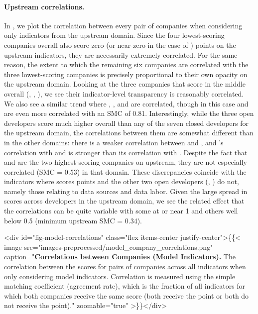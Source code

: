 \documentclass[screen, authorversion, acmsmall]{acmart}
\begin{document}
\paragraph{Upstream correlations.}
In , we plot the correlation between every pair of companies when considering only indicators from the upstream domain.
Since the four lowest-scoring companies overall also score zero (or near-zero in the case of \cohere) points on the upstream indicators, they are necessarily extremely correlated.
For the same reason, the extent to which the remaining six companies are correlated with the three lowest-scoring companies is precisely proportional to their own opacity on the upstream domain.
Looking at the three companies that score in the middle overall (\google, \anthropic, \cohere), we see their indicator-level transparency is reasonably correlated.
We also see a similar trend where \openai, \google, and \anthropic are correlated, though in this case \openai and \cohere are even more correlated with an SMC of 0.81.
Interestingly, while the three open developers score much higher overall than any of the seven closed developers for the upstream domain, the correlations between them are somewhat different than in the other domains: there is a weaker correlation between \huggingface and \stability, and \meta's correlation with \openai and \stability is stronger than its correlation with \huggingface.
Despite the fact that \meta and \huggingface are the two highest-scoring companies on upstream, they are not especially correlated (SMC = 0.53) in that domain.
These discrepancies coincide with the indicators where \huggingface scores points and the other two open developers (\meta, \stability) do not, namely those relating to data sources and data labor. 
Given the large spread in scores across developers in the upstream domain, we see the related effect that the correlations can be quite variable with some at or near 1 and others well below 0.5 (minimum upstream SMC = 0.34).

<div id="fig-model-correlations" class="flex items-center justify-center">\{\{< image src="images-preprocessed/model_company_correlations.png" caption="\textbf{Correlations between Companies (Model Indicators).} The correlation between the scores for pairs of companies across all indicators when only considering model indicators. Correlation is measured using the simple matching coefficient (\ie agreement rate), which is the fraction of all indicators for which both companies receive the same score (\ie both receive the point or both do not receive the point)." zoomable="true" >\}\}</div>
\end{document}
